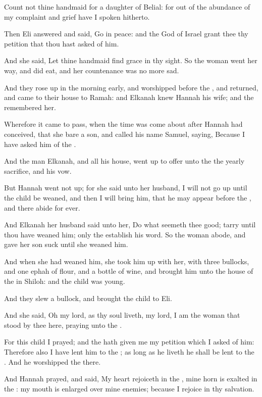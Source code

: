 \Verse Count not thine handmaid for a daughter of Belial: for out of the abundance of my complaint and grief have I spoken hitherto.

\Verse Then Eli answered and said, Go in peace: and the God of Israel grant thee thy petition that thou hast asked of him.

\Verse And she said, Let thine handmaid find grace in thy sight. So the woman went her way, and did eat, and her countenance was no more sad.

\Verse And they rose up in the morning early, and worshipped before the \LORD, and returned, and came to their house to Ramah: and Elkanah knew Hannah his wife; and the \LORD remembered her.

\Verse Wherefore it came to pass, when the time was come about after Hannah had conceived, that she bare a son, and called his name Samuel, saying, Because I have asked him of the \LORD.

\Verse And the man Elkanah, and all his house, went up to offer unto the \LORD the yearly sacrifice, and his vow.

\Verse But Hannah went not up; for she said unto her husband, I will not go up until the child be weaned, and then I will bring him, that he may appear before the \LORD, and there abide for ever.

\Verse And Elkanah her husband said unto her, Do what seemeth thee good; tarry until thou have weaned him; only the \LORD establish his word. So the woman abode, and gave her son suck until she weaned him.

\Verse And when she had weaned him, she took him up with her, with three bullocks, and one ephah of flour, and a bottle of wine, and brought him unto the house of the \LORD in Shiloh: and the child was young.

\Verse And they slew a bullock, and brought the child to Eli.

\Verse And she said, Oh my lord, as thy soul liveth, my lord, I am the woman that stood by thee here, praying unto the \LORD.

\Verse For this child I prayed; and the \LORD hath given me my petition which I asked of him: \Verse Therefore also I have lent him to the \LORD; as long as he liveth he shall be lent to the \LORD. And he worshipped the \LORD there.


\Chapter
\Verse And Hannah prayed, and said, My heart rejoiceth in the \LORD, mine horn is exalted in the \LORD: my mouth is enlarged over mine enemies; because I rejoice in thy salvation.


